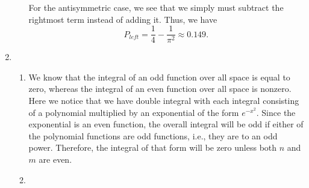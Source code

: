 \documentclass[10pt]{article}
\begin{document}
\begin{enumerate}
\begin{enumerate}
    For the antisymmetric case, we see that we simply must subtract the rightmost term instead of adding it.
    Thus, we have
    \[
     P_{left} = \frac{1}{4} - \frac{1}{\pi^2} \approx \num{0,149}
    .\]
  \end{enumerate}
\item 
  \begin{enumerate}
  \item 
    We know that the integral of an odd function over all space is equal to zero, whereas the integral of an even function over all space is nonzero.
    Here we notice that we have double integral with each integral consisting of a polynomial multiplied by an exponential of the form $ e ^ {-x^2} $.
    Since the exponential is an even function, the overall integral will be odd if either of the polynomial functions are odd functions, i.e., they are to an odd power.
    Therefore, the integral of that form will be zero unless both $ n $ and $ m $ are even.
  \item 
    

\end{enumerate}
\end{enumerate}
\end{document}
